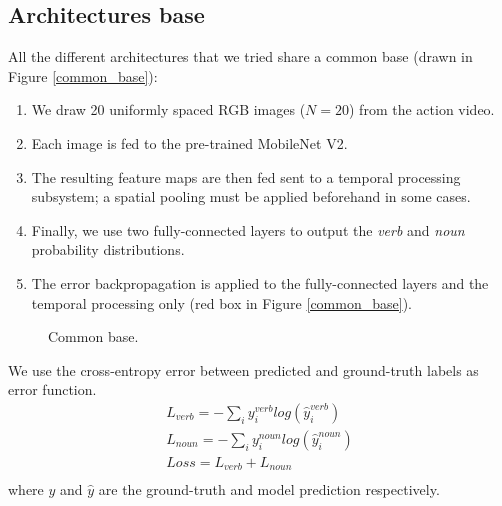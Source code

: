 \documentclass[12pt, a4paper]{report}
\begin{document}
			\subsection{Architectures base}
				All the different architectures that we tried share a common base (drawn in Figure \ref{common_base}):
				\begin{enumerate}
					\item We draw 20 uniformly spaced RGB images ($N=20$) from the action video.
					\item Each image is fed to the pre-trained MobileNet V2.
					\item The resulting feature maps are then fed sent to a temporal processing subsystem; a spatial pooling must be applied beforehand in some cases.
					\item Finally, we use two fully-connected layers to output the {\itshape verb} and {\itshape noun} probability distributions.
					\item The error backpropagation is applied to the fully-connected layers and the temporal processing only (red box in Figure \ref{common_base}).
				\end{enumerate}
				\begin{figure}[h!]
					\centering
					\caption{Common base.}
				\end{figure}
				We use the cross-entropy error between predicted and ground-truth labels as error function.
				\begin{align*}
					L_{verb} = -\sum_{i} y^{verb}_{i}log(\hat{y}^{verb}_{i}) \\
					L_{noun} = -\sum_{i} y^{noun}_{i}log(\hat{y}^{noun}_{i}) \\
					Loss = L_{verb} + L_{noun} \\
				\end{align*}
				where $y$ and $\hat{y}$ are the ground-truth and model prediction respectively.
\end{document}
